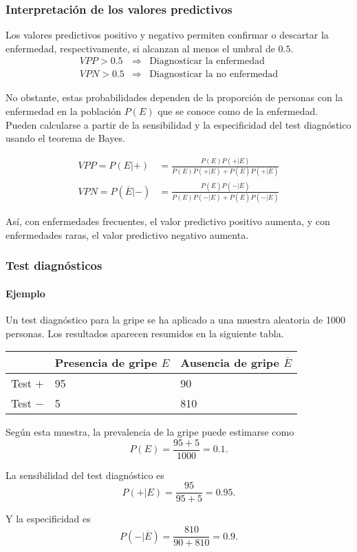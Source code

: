 \begin{frame}
\frametitle{Interpretación de los valores predictivos}
Los valores predictivos positivo y negativo permiten confirmar o descartar la enfermedad, respectivamente, si alcanzan al menos el umbral de $0.5$.
\[
	\begin{array}{rcl}
	VPP>0.5 & \Rightarrow & \mbox{Diagnosticar la enfermedad}\\
	VPN>0.5 & \Rightarrow & \mbox{Diagnosticar la no enfermedad} 
	\end{array}
\]
	
No obstante, estas probabilidades dependen de la proporción de personas con la enfermedad en la población $P(E)$ que se conoce como  de la enfermedad.
Pueden calcularse a partir de la sensibilidad y la especificidad del test diagnóstico usando el teorema de Bayes.
	
\begin{align*}
VPP=P(E|+) &= \frac{P(E)P(+|E)}{P(E)P(+|E)+P(\overline{E})P(+|\overline{E})}\\
VPN=P(\overline{E}|-) &= \frac{P(\overline{E})P(-|\overline{E})}{P(E)P(-|E)+P(\overline{E})P(-|\overline{E})}
\end{align*} 
	
Así, con enfermedades frecuentes, el valor predictivo positivo aumenta, y con enfermedades raras, el valor predictivo negativo aumenta.
\end{frame}


\begin{frame}
\frametitle{Test diagnósticos}
\framesubtitle{Ejemplo}
Un test diagnóstico para la gripe se ha aplicado a una muestra aleatoria de 1000 personas.
Los resultados aparecen resumidos en la siguiente tabla.
\begin{center}
	\begin{tabular}{|m{2.5cm}|m{3.2cm}<{\centering}|m{3.2cm}<{\centering}|}
	\cline{2-3}
	\multicolumn{1}{c|}{} & Presencia de gripe $E$ & Ausencia de gripe $\overline E$\\ \hline
	Test $+$ & 95 & 90 \\
	\hline
	Test $-$ & 5 & 810 \\
	\hline
	\end{tabular}
\end{center}
	
Según esta muestra, la prevalencia de la gripe puede estimarse como
\[
	P(E) = \frac{95+5}{1000} = 0.1.
\] 
	
La sensibilidad del test diagnóstico es 
\[
	P(+|E) = \frac{95}{95+5}= 0.95. 
\] 
	
Y la especificidad es 
\[
	P(-|\overline{E}) = \frac{810}{90+810}=0.9.
\]
\end{frame}
	
